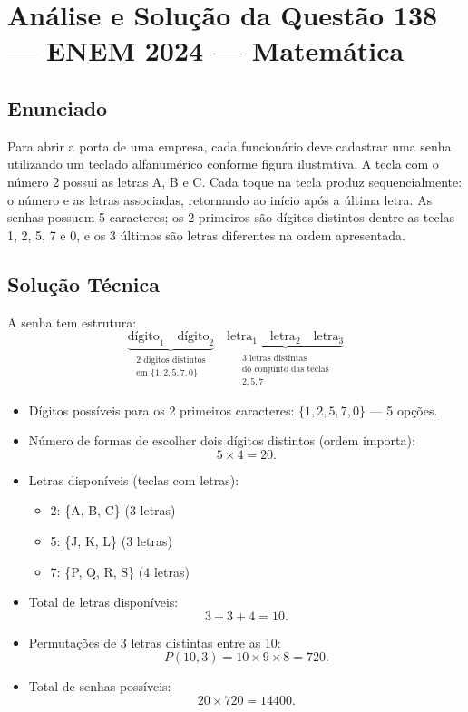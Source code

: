 \documentclass{article}
\begin{document}
\section*{Análise e Solução da Questão 138 — ENEM 2024 — Matemática}

\subsection*{Enunciado}
Para abrir a porta de uma empresa, cada funcionário deve cadastrar uma senha utilizando um teclado alfanumérico conforme figura ilustrativa. A tecla com o número 2 possui as letras A, B e C. Cada toque na tecla produz sequencialmente: o número e as letras associadas, retornando ao início após a última letra. As senhas possuem 5 caracteres; os 2 primeiros são dígitos distintos dentre as teclas 1, 2, 5, 7 e 0, e os 3 últimos são letras diferentes na ordem apresentada.

\subsection*{Solução Técnica}

A senha tem estrutura:
\[
\underbrace{\text{dígito}_1 \quad \text{dígito}_2}_{\substack{\text{2 dígitos distintos} \\ \text{em } \{1,2,5,7,0\}}} \quad \underbrace{\text{letra}_1 \quad \text{letra}_2 \quad \text{letra}_3}_{\substack{\text{3 letras distintas} \\ \text{do conjunto das teclas} \\ 2,5,7}}
\]

\begin{itemize}
\item Dígitos possíveis para os 2 primeiros caracteres: $\{1,2,5,7,0\}$ — 5 opções.
\item Número de formas de escolher dois dígitos distintos (ordem importa):
\[
5 \times 4 = 20.
\]
\item Letras disponíveis (teclas com letras):
\begin{itemize}
\item 2: \{A, B, C\} (3 letras)
\item 5: \{J, K, L\} (3 letras)
\item 7: \{P, Q, R, S\} (4 letras)
\end{itemize}
\item Total de letras disponíveis:
\[
3 + 3 + 4 = 10.
\]
\item Permutações de 3 letras distintas entre as 10:
\[
P(10,3) = 10 \times 9 \times 8 = 720.
\]
\item Total de senhas possíveis:
\[
20 \times 720 = 14400.
\]
\end{itemize}
\end{document}
